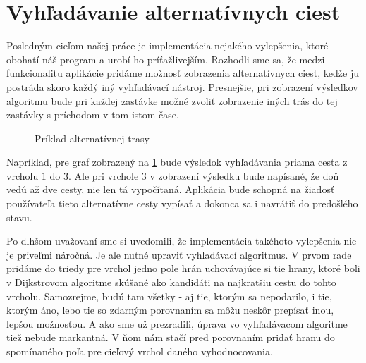 \section{Vyhľadávanie alternatívnych ciest}

Posledným cieľom našej práce je implementácia nejakého vylepšenia, ktoré obohatí náš program a urobí ho príťažlivejším. Rozhodli sme sa, že medzi funkcionalitu aplikácie pridáme možnosť zobrazenia alternatívnych ciest, keďže ju postráda skoro každý iný vyhľadávací nástroj. Presnejšie, pri zobrazení výsledkov algoritmu bude pri každej zastávke možné zvoliť zobrazenie iných trás do tej zastávky s príchodom v tom istom čase.\newline 

\begin{figure}[H]
\caption{Príklad alternatívnej trasy}
\label{alternativ_priklad}
\end{figure}

Napríklad, pre graf zobrazený na \ref{alternativ_priklad} bude výsledok vyhľadávania priama cesta z vrcholu $1$ do $3$. Ale pri vrchole $3$ v zobrazení výsledku bude napísané, že doň vedú až dve cesty, nie len tá vypočítaná. Aplikácia bude schopná na žiadosť používateľa tieto alternatívne cesty vypísať a dokonca sa i navrátiť do predošlého stavu.\newline

Po dlhšom uvažovaní sme si uvedomili, že implementácia takéhoto vylepšenia nie je priveľmi náročná. Je ale nutné upraviť vyhľadávací algoritmus. V prvom rade pridáme do triedy pre vrchol jedno pole hrán uchovávajúce si tie hrany, ktoré boli v Dijkstrovom algoritme skúšané ako kandidáti na najkratšiu cestu do tohto vrcholu. Samozrejme, budú tam všetky - aj tie, ktorým sa nepodarilo, i tie, ktorým áno, lebo tie so zdarným porovnaním sa môžu neskôr prepísať inou, lepšou možnosťou. A ako sme už prezradili, úprava vo vyhľadávacom algoritme tiež nebude markantná. V ňom nám stačí pred porovnaním pridať hranu do spomínaného poľa pre cieľový vrchol daného vyhodnocovania.\newline

